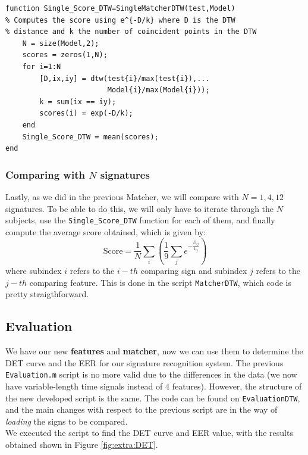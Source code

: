 \documentclass[a4paper]{article}
\def\inline{\lstinline[basicstyle=\ttfamily,keywordstyle={}]}
\begin{document}
{\begin{verbatim}
function Single_Score_DTW=SingleMatcherDTW(test,Model)
% Computes the score using e^{-D/k} where D is the DTW
% distance and k the number of coincident points in the DTW
    N = size(Model,2);
    scores = zeros(1,N);
    for i=1:N
        [D,ix,iy] = dtw(test{i}/max(test{i}),...
                        Model{i}/max(Model{i}));
        k = sum(ix == iy);
        scores(i) = exp(-D/k);
    end
    Single_Score_DTW = mean(scores);
end
\end{verbatim}

\subsubsection*{Comparing with \(N\) signatures}

Lastly, as we did in the previous Matcher, we will compare with \(N=1,4,12\) signatures. To be able to do this, we will only have to iterate through the \(N\) subjects, use the \inline{Single_Score_DTW} function for each of them, and finally compute the average score obtained, which is given by:
\[
\text{Score} = \frac{1}{N}\sum_{i} \left( \frac{1}{9}\sum_{j} e^{-\frac{D_{ij}}{k_{ij}}}\right)
\]
where subindex \(i\) refers to the \(i-th\) comparing sign and subindex \(j\) refers to the \(j-th\) comparing feature. This is done in the script \inline{MatcherDTW}, which code is pretty straigthforward.


\subsection*{Evaluation}

We have our new \textbf{features} and \textbf{matcher}, now we can use them to determine the DET curve and the EER for our signature recognition system. The previous \inline{Evaluation.m} script is no more valid due to the differences in the data (we now have variable-length time signals instead of \(4\)
features). However, the structure of the new developed script is the same.  The code can be found on \inline{EvaluationDTW}, and the main changes with respect to the previous script are in the way of \emph{loading} the signs to be compared.\\

We executed the script to find the DET curve and EER value, with the results obtained shown in Figure \ref{fig:extra:DET}.

}
\end{document}
